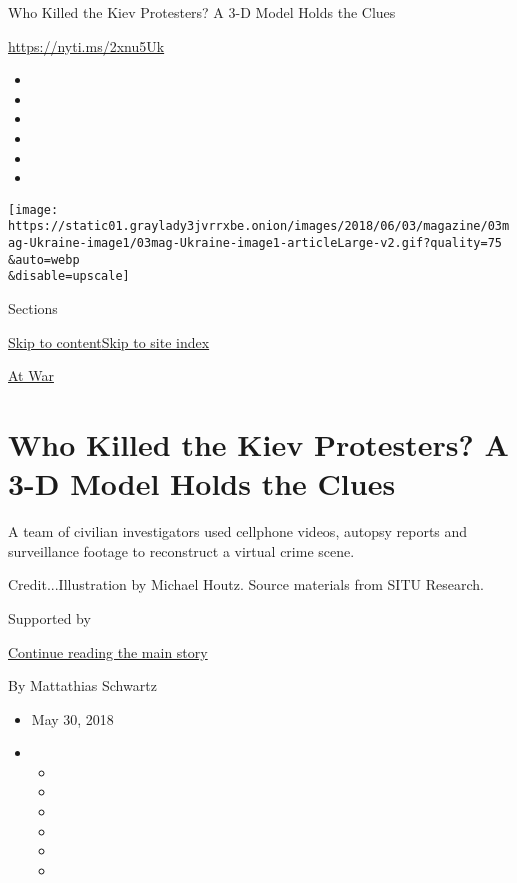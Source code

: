 Who Killed the Kiev Protesters? A 3-D Model Holds the Clues

\url{https://nyti.ms/2xnu5Uk}

\begin{itemize}
\item
\item
\item
\item
\item
\item
\end{itemize}

\texttt{[image: https://static01.graylady3jvrrxbe.onion/images/2018/06/03/magazine/03mag-Ukraine-image1/03mag-Ukraine-image1-articleLarge-v2.gif?quality=75\\\&auto=webp\\\&disable=upscale]}

Sections

\protect\hyperlink{site-content}{Skip to
content}\protect\hyperlink{site-index}{Skip to site index}

\href{/column/at-war}{At War}

\hypertarget{who-killed-the-kiev-protesters-a-3-d-model-holds-the-clues}{%
\section{Who Killed the Kiev Protesters? A 3-D Model Holds the
Clues}\label{who-killed-the-kiev-protesters-a-3-d-model-holds-the-clues}}

A team of civilian investigators used cellphone videos, autopsy reports
and surveillance footage to reconstruct a virtual crime scene.

Credit...Illustration by Michael Houtz. Source materials from SITU
Research.

Supported by

\protect\hyperlink{after-sponsor}{Continue reading the main story}

By Mattathias Schwartz

\begin{itemize}
\item
  May 30, 2018
\item
  \begin{itemize}
  \item
  \item
  \item
  \item
  \item
  \item
  \end{itemize}
\end{itemize}

